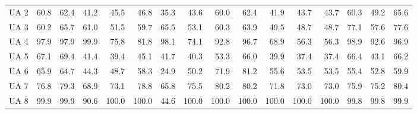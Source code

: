\documentclass[a4paper,10pt,DIV=16]{scrartcl}
\begin{document}
\begin{table}[h]
\begin{tabular}{lrrrrrrrrrrrrrrr}
    UA 2 & 60.8 & 62.4 & 41.2 & 45.5 & 46.8 & 35.3 & 43.6 & 60.0 & 62.4 & 41.9 & 43.7 & 43.7 & 60.3 & 49.2 & 65.6 \\
    UA 3 & 60.2 & 65.7 & 61.0 & 51.5 & 59.7 & 65.5 & 53.1 & 60.3 & 63.9 & 49.5 & 48.7 & 48.7 & 77.1 & 57.6 & 77.6 \\
    UA 4 & 97.9 & 97.9 & 99.9 & 75.8 & 81.8 & 98.1 & 74.1 & 92.8 & 96.7 & 68.9 & 56.3 & 56.3 & 98.9 & 92.6 & 96.9 \\
    UA 5 & 67.1 & 69.4 & 41.4 & 39.4 & 45.1 & 41.7 & 40.3 & 53.3 & 66.0 & 39.9 & 37.4 & 37.4 & 66.4 & 43.1 & 66.2 \\
    UA 6 & 65.9 & 64.7 & 44.3 & 48.7 & 58.3 & 24.9 & 50.2 & 71.9 & 81.2 & 55.6 & 53.5 & 53.5 & 55.4 & 52.8 & 59.9 \\
    UA 7 & 76.8 & 79.3 & 68.9 & 73.1 & 78.8 & 65.8 & 75.5 & 80.2 & 80.2 & 71.8 & 73.0 & 73.0 & 75.9 & 75.2 & 80.4 \\
    UA 8 & 99.9 & 99.9 & 90.6 & 100.0 & 100.0 & 44.6 & 100.0 & 100.0 & 100.0 & 100.0 & 100.0 & 100.0 & 99.8 & 99.8 & 99.9 \\
  \end{tabular}
\end{table}
\end{document}
